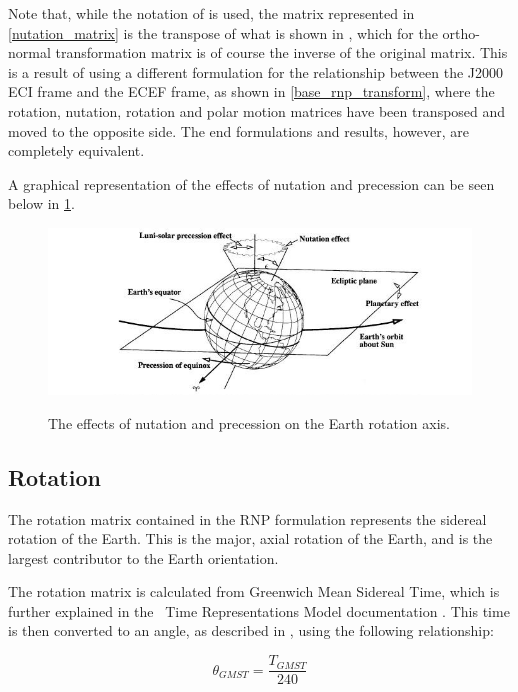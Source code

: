 Note that, while the notation of \cite{Bond1} is used, the matrix represented in
\eqref{nutation_matrix} is the transpose of what is shown in \cite{Bond1}, which
for the ortho-normal transformation matrix is of course the inverse of the
original matrix. This is a result of \cite{ValladoThird}
using a different formulation for the relationship between the J2000 ECI frame
and the ECEF frame, as shown in \ref{base_rnp_transform}, where the rotation,
nutation, rotation and polar motion matrices have been transposed and moved
to the opposite side. The end formulations and results, 
however, are completely equivalent.


A graphical representation of the effects of nutation and precession can be
seen below in \ref{fig:nut_and_prec}.

\begin{figure} [H]
\begin{center}
\label{fig:nut_and_prec}
\includegraphics {fig/rnpfig2.jpg}
\caption{The effects of nutation and precession on the Earth
rotation axis.\cite{ValladoThird}}
\end{center}
\end{figure}
\subsection{Rotation}

The rotation matrix contained in the RNP formulation represents the sidereal
rotation of the Earth. This is the major, axial rotation of the Earth, and is
the largest contributor to the Earth orientation.

The rotation matrix is calculated from Greenwich Mean Sidereal Time, which
is further explained in the \JEODid\ Time Representations Model documentation \cite{dynenv:TIME}.
This time is then converted to an angle, as described in \cite{ValladoThird},
using the following relationship:

\begin{equation} \label{GMST_time_to_angle}
\theta_{GMST} = \frac{T_{GMST}}{240}
\end{equation}

